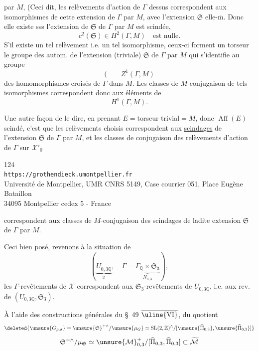 par $M$,  (Ceci dit, les relèvements d'action de $\Gamma$ dessus correspondent aux isomorphismes de cette extension de $\Gamma$ par $M$, avec l'extension $\mathfrak S$ elle-$\overline{\mathrm m}$. Donc elle existe sss l'extension de $\mathfrak S$ de $\Gamma$ par $M$ est scindée,  
\[
c^2(\mathfrak S)\in H^2(\Gamma,M)\quad\text{est nulle.}
\tag{282}
\]
S'il existe un tel relèvement i.e. un tel isomorphisme, ceux-ci forment un torseur  le groupe des autom. de l'extension (triviale) $\mathfrak S$ de $\Gamma$ par $M$ qui s'identifie au groupe
\[
(\qquad Z^1(\Gamma,M)
\]
des homomorphismes croisés de $\Gamma$ dans $M$. Les classes de $M$-conjugaison de tels  isomorphismes correspondent donc aux éléments de
\[
H^1(\Gamma,M).
\]

Une autre façon de le dire, en prenant $E={}$torseur trivial${}=M$, donc $\operatorname{Aff}(E)$ scindé, c'est que les relèvements choisis correspondent aux \uline{scindages} de l'extension $\mathfrak S$ de $\Gamma$ par $M$, et les classes de conjugaison des relèvements d'action de $\Gamma$ sur $\mathcal X'_0$


\begin{center}
\small
124\\
\texttt{https://grothendieck.umontpellier.fr}\\
Université de Montpellier, UMR CNRS 5149, Case courrier 051, Place Eugène Bataillon\\
34095 Montpellier cedex 5 - France
\end{center}

correspondent aux classes de $M$-conjugaison des scindages de ladite extension $\mathfrak S$ de $\Gamma$ par $M$.

Ceci bien posé, revenons à la situation de
\[
\left(\underbrace{U_{0,3\overline{\mathbb Q}}}_{\mathcal X},\quad
\Gamma=\underbrace{\Gamma_{\mathbb Q}\times\mathfrak S_3}_{N_{0,3}}\right),
\]
les $\Gamma$-revêtements de $\mathcal X$ correspondent aux $\mathfrak S_3$-revêtements de $U_{0,3\mathbb Q}$, i.e. aux rev. de $(U_{0,3\mathbb Q},\mathfrak S_3)$.


À l'aide des constructions générales du \S~49 $\overline{\uline{\mathrm{VI}}}$,  du quotient
\[
\deleted{\unsure{G_{\rho,\sigma}}=\unsure{\mathfrak S}^{+\wedge}/\unsure{\mu_G}\simeq
\operatorname{SL}(2,\mathbb Z)^\wedge/
[\unsure{\widehat\Pi_{0,3}},\unsure{\widehat\Pi_{0,3}}]}
\]
\[
\mathfrak S^{+\wedge}/\mu_{\mathfrak S}\simeq
\unsure{\mathcal M}_{0,3}^{+}/[\widehat\Pi_{0,3},\widehat\Pi_{0,3}]
\subset\widetilde{\mathcal M}
\]

